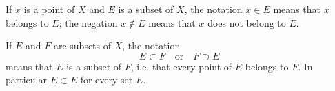 If $x$ is a point of $X$ and $E$ is a subset of $X$, the notation $x \in E$ means that $x$ belongs to $E$; the negation $x \not\in E$ means that $x$ does not belong to $E$.

If $E$ and $F$ are subsets of $X$, the notation
$$E \subset F \quad \text{or} \quad F \supset E$$
means that $E$ is a subset of $F$, i.e. that every point of $E$ belongs to $F$. In particular $E \subset E$ for every set $E$.

